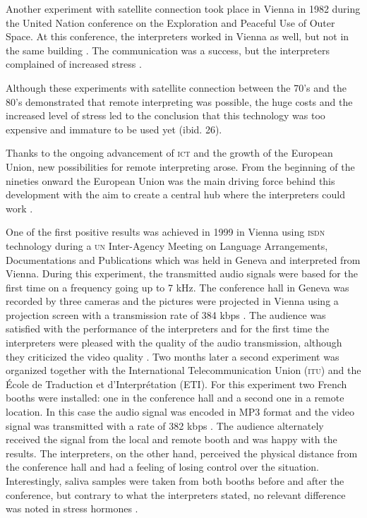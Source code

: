 \documentclass[output=paper]{langsci/langscibook}
\begin{document}
Another experiment with satellite connection took place in Vienna in 1982 during the United Nation conference on the Exploration and Peaceful Use of Outer Space. At this conference, the interpreters worked in Vienna as well, but not in the same building \citep[10]{Andres2009}. The communication was a success, but the interpreters complained of increased stress \citep[26]{UNESCO1987}.

Although these experiments with satellite connection between the 70’s and the 80’s demonstrated that remote interpreting was possible, the huge costs and the increased level of stress led to the conclusion that this technology was too expensive and immature to be used yet (ibid. 26).

Thanks to the ongoing advancement of \textsc{ict} and the growth of the European Union, new possibilities for remote interpreting arose. From the beginning of the nineties onward the European Union was the main driving force behind this development with the aim to create a central hub where the interpreters could work \citep[3]{Braun2011b}.

One of the first positive results was achieved in 1999 in Vienna using \textsc{isdn} technology during a \textsc{un} Inter-Agency Meeting on Language Arrangements, Documentations and Publications which was held in Geneva and interpreted from Vienna. During this experiment, the transmitted audio signals were based for the first time on a frequency going up to 7 kHz. The conference hall in Geneva was recorded by three cameras and the pictures were projected in Vienna using a projection screen with a transmission rate of 384 kbps \citep[63]{Mouzourakis2006}. The audience was satisfied with the performance of the interpreters and for the first time the interpreters were pleased with the quality of the audio transmission, although they criticized the video quality \citep[11]{Andres2009}. Two months later a second experiment was organized together with the International Telecommunication Union (\textsc{itu}) and the École de Traduction et d’Interprétation (\textsc{ETI}). For this experiment two French booths were installed: one in the conference hall and a second one in a remote location. In this case the audio signal was encoded in MP3 format and the video signal was transmitted with a rate of 382 kbps \citep[63]{Mouzourakis2006}. The audience alternately received the signal from the local and remote booth and was happy with the results. The interpreters, on the other hand, perceived the physical distance from the conference hall and had a feeling of losing control over the situation. Interestingly, saliva samples were taken from both booths before and after the conference, but contrary to what the interpreters stated, no relevant difference was noted in stress hormones \citep{Moser-Mercer2003}.
\end{document}
